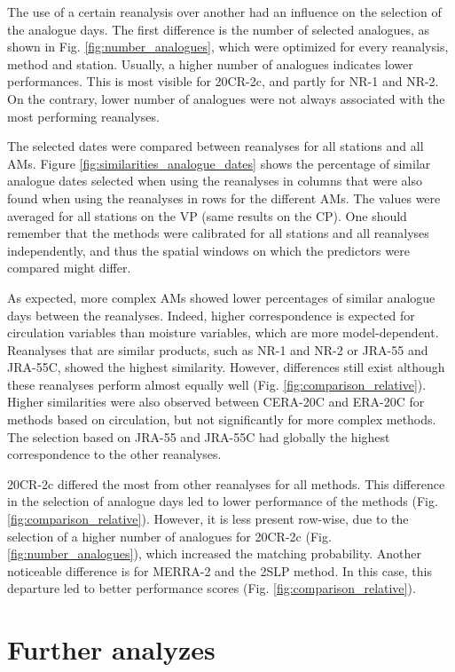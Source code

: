\documentclass{ametsoc}
\begin{document}
The use of a certain reanalysis over another had an influence on the selection of the analogue days. The first difference is the number of selected analogues, as shown in Fig. \ref{fig:number_analogues}, which were optimized for every reanalysis, method and station. Usually, a higher number of analogues indicates lower performances. This is most visible for 20CR-2c, and partly for NR-1 and NR-2. On the contrary, lower number of analogues were not always associated with the most performing reanalyses.

The selected dates were compared between reanalyses for all stations and all AMs. Figure \ref{fig:similarities_analogue_dates} shows the percentage of similar analogue dates selected when using the reanalyses in columns that were also found when using the reanalyses in rows for the different AMs. The values were averaged for all stations on the VP (same results on the CP). One should remember that the methods were calibrated for all stations and all reanalyses independently, and thus the spatial windows on which the predictors were compared might differ.

As expected, more complex AMs showed lower percentages of similar analogue days between the reanalyses. Indeed, higher correspondence is expected for circulation variables than moisture variables, which are more model-dependent. Reanalyses that are similar products, such as NR-1 and NR-2 or JRA-55 and JRA-55C, showed the highest similarity. However, differences still exist although these reanalyses perform almost equally well (Fig. \ref{fig:comparison_relative}). Higher similarities were also observed between CERA-20C and ERA-20C for methods based on circulation, but not significantly for more complex methods. The selection based on JRA-55 and JRA-55C had globally the highest correspondence to the other reanalyses.

20CR-2c differed the most from other reanalyses for all methods. This difference in the selection of analogue days led to lower performance of the methods (Fig. \ref{fig:comparison_relative}). However, it is less present row-wise, due to the selection of a higher number of analogues for 20CR-2c (Fig. \ref{fig:number_analogues}), which increased the matching probability. Another noticeable difference is for MERRA-2 and the 2SLP method. In this case, this departure led to better performance scores (Fig. \ref{fig:comparison_relative}).


\section{Further analyzes}
\label{sec:analyzes}
\end{document}
